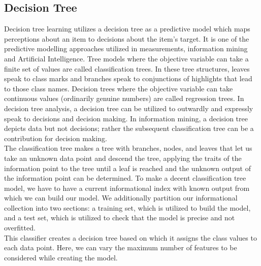 \documentclass[oneside,12pt]{Classes/VTU}
\begin{document}
    	
    
    
    	\subsection{Decision Tree}
    	Decision tree learning utilizes a decision tree as a predictive model which maps perceptions about an item to decisions about the item's target. It is one of the predictive modelling approaches utilized in measurements, information mining and Artificial Intelligence. Tree models where the objective variable can take a finite set of values are called classification trees. In these tree structures, leaves speak to class marks and branches speak to conjunctions of highlights that lead to those class names. Decision trees where the objective variable can take continuous values (ordinarily genuine numbers) are called regression trees. In decision tree analysis, a decision tree can be utilized to outwardly and expressly speak to decisions and decision making. In information mining, a decision tree depicts data but not decisions; rather the subsequent classification tree can be a contribution for decision making.\\
    	The classification tree makes a tree with branches, nodes, and leaves that let us take an unknown data point and descend the tree, applying the traits of the information point to the tree until a leaf is reached and the unknown output of the information point can be determined. To make a decent classification tree model, we have to have a current informational index with known output from which we can build our model. We additionally partition our informational collection into two sections: a training set, which is utilized to build the model, and a test set, which is utilized to check that the model is precise and not overfitted. \\
    	This classifier creates a decision tree based on which it assigns the class values to each data point. Here, we can vary the maximum number of features to be considered while creating the model.\\
    	
\end{document}
